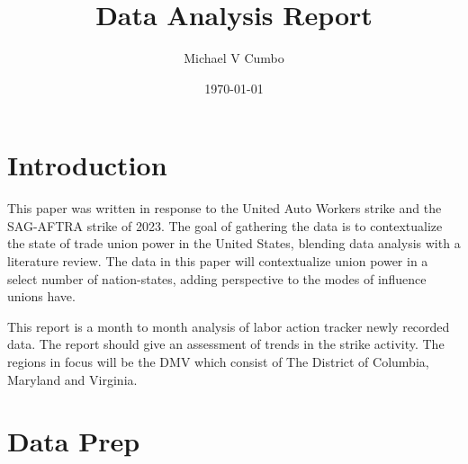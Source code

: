 \documentclass[11pt]{article}\usepackage[]{graphicx}\usepackage[]{xcolor}
\title{\textbf{Data Analysis Report}}
\author{Michael V Cumbo}
\date{\today}
\begin{document}
\maketitle

\section{Introduction}
This paper was written in response to the United Auto Workers strike and the SAG-AFTRA strike of 2023. The goal of gathering the data is to contextualize the state of trade union power in the United States, blending data analysis with a literature review. 
The data in this paper will contextualize union power in a select number of nation-states, adding perspective to the modes of influence unions have.

This report is a month to month analysis of labor action tracker newly recorded data. The report should give an assessment of trends in the strike activity.
The regions in focus will be the DMV which consist of The District of Columbia, Maryland and Virginia.

\section{Data Prep}
\end{document}
